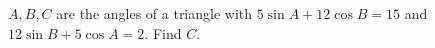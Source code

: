 $A,B,C$ are the angles of a triangle with $5\sin A+12\cos B=15$ and $12\sin B+5\cos A=2$. Find $C$.
